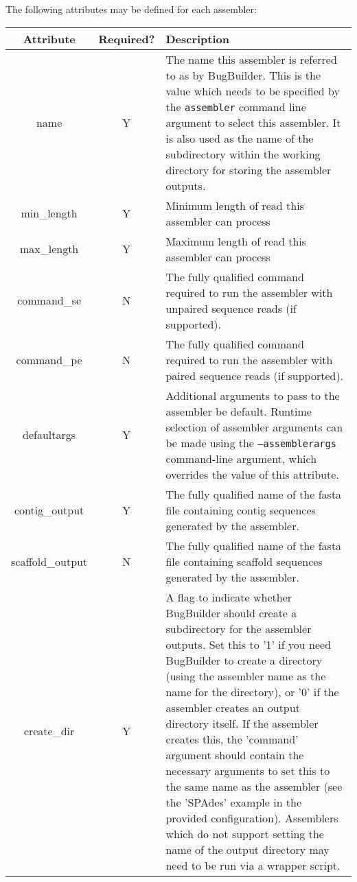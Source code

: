 \documentclass[a4paper,10pt]{article}
\begin{document}
The following attributes may be defined for each assembler:

\begin{table}[htb]
  \begin{tabular}{c  c p{10cm}}
    \hline
    \textbf {Attribute} &  \textbf{Required?}  & \textbf{Description}  \\
    \hline
    name & Y & The name this assembler is referred to as by BugBuilder. This is the value which
    needs to be specified by the {\tt assembler} command line argument to select this assembler. It is
    also used as the name of the subdirectory within the working directory for storing the assembler
    outputs.  \\
    min\_length & Y & Minimum length of read this assembler can process \\
    max\_length & Y & Maximum length of read this assembler can process\\
    command\_se & N & The fully qualified command required to run the assembler with unpaired sequence reads  (if supported).\\
    command\_pe & N & The fully qualified command required to run the assembler with paired sequence reads (if supported).\\
    default\-args & Y & Additional arguments to pass to the assembler be default. Runtime selection of assembler arguments can be made using the {\tt --assembler\-args} command-line argument, which overrides the value of this attribute.\\
    contig\_output & Y &  The fully qualified name of the fasta file containing contig sequences generated by the assembler.\\
    scaffold\_output &  N & The fully qualified name of the fasta file containing scaffold sequences generated by the assembler.\\
    create\_dir & Y & A flag to indicate whether BugBuilder should create a subdirectory for the assembler outputs. Set this to '1' if you need BugBuilder to create a directory (using the
assembler name as the name for the directory), or '0' if the assembler creates an output directory itself. If the assembler creates this, the 'command' argument should contain the necessary arguments to set this to the same name  as the assembler (see the 'SPAdes' example in the provided configuration). Assemblers which do not support setting the name of the output directory may need to be run via a wrapper script.\\
    \hline
    \end{tabular}
  \label{tab:assatt}
\end{table}
\end{document}
